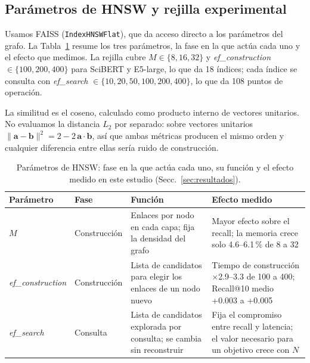\documentclass[runningheads]{llncs}
\newcommand{\efc}{\textit{ef\_construction}}
\newcommand{\efs}{\textit{ef\_search}}
\begin{document}
\subsection{Parámetros de HNSW y rejilla experimental}

Usamos FAISS \cite{ref7} (\texttt{IndexHNSWFlat}), que da acceso directo a los parámetros
del grafo. La Tabla~\ref{tab:parametros} resume los tres parámetros, la fase en la que actúa
cada uno y el efecto que medimos. La rejilla cubre $M \in \{8,16,32\}$ y
\efc{} $\in \{100,200,400\}$ para SciBERT y E5-large, lo que da 18 índices; cada índice se
consulta con \efs{} $\in \{10,20,50,100,200,400\}$, lo que da 108 puntos de operación.

La similitud es el coseno, calculado como producto interno de vectores unitarios. No
evaluamos la distancia $L_2$ por separado: sobre vectores unitarios
$\lVert \mathbf{a}-\mathbf{b} \rVert^2 = 2 - 2\,\mathbf{a}\cdot\mathbf{b}$, así que ambas
métricas producen el mismo orden y cualquier diferencia entre ellas sería ruido de
construcción.

\begin{table}[tbp]
\caption{Parámetros de HNSW: fase en la que actúa cada uno, su función y el efecto medido en
este estudio (Secc.~\ref{sec:resultados}).}\label{tab:parametros}
\centering
\small
\begin{tabular}{|l|l|>{\raggedright\arraybackslash}p{3.7cm}|>{\raggedright\arraybackslash}p{3.7cm}|}
\hline
\textbf{Parámetro} & \textbf{Fase} & \textbf{Función} & \textbf{Efecto medido} \\
\hline
$M$ & Construcción & Enlaces por nodo en cada capa; fija la densidad del grafo &
Mayor efecto sobre el recall; la memoria crece solo 4.6--6.1\,\% de 8 a 32 \\
\hline
\efc{} & Construcción & Lista de candidatos para elegir los enlaces de un nodo nuevo &
Tiempo de construcción $\times$2.9--3.3 de 100 a 400; Recall@10 medio +0.003 a +0.005 \\
\hline
\efs{} & Consulta & Lista de candidatos explorada por consulta; se cambia sin reconstruir &
Fija el compromiso entre recall y latencia; el valor necesario para un objetivo crece con
$N$ \\
\hline
\end{tabular}
\end{table}

\end{document}
